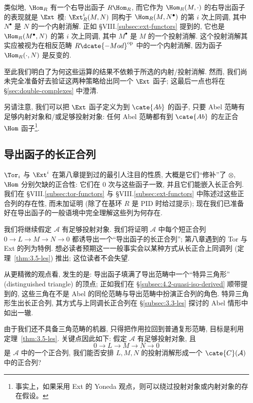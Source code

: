 \begin{example}\label{ex:7.7-ext}
类似地, $\Hom_R$ 有一个右导出函子 $R\Hom_R$, 而它作为 $\Hom_R(M,\cdot)$ 的右导出函子的表现就是 $\Ext$ 模: $\Ext_R^i(M,N)$ 同构于 $\Hom_R(M,N^\bullet)$ 的第 $i$ 次上同调, 其中 $N^\bullet$ 是 $N$ 的一个内射消解. 正如 §VIII.\ref{subsec:ext-functors} 提到的, 它也是 $\Hom_R(M^\bullet,N)$ 的第 $i$ 次上同调, 其中 $M^\bullet$ 是 $M$ 的一个投射消解. 这个投射消解其实应被视为在相反范畴 $R\dcate{-Mod}^{\mathrm{op}}$ 中的一个内射消解, 因为函子 $\Hom_R(\cdot,N)$ 是反变的.

至此我们明白了为何这些运算的结果不依赖于所选的内射/投射消解. 然而, 我们尚未完全准备好去验证这两种策略给出同一个 $\Ext$ 函子; 这最后一点也将在 \S\ref{sec:double-complexes} 中澄清.

另请注意, 我们可以把 $\Ext$ 函子定义为到 $\cate{Ab}$ 的函子, 只要 Abel 范畴有足够内射对象和/或足够投射对象: 任何 Abel 范畴都有到 $\cate{Ab}$ 的左正合 $\Hom$ 函子\footnote{事实上，如果采用 Ext 的 Yoneda 观点，则可以绕过投射对象或内射对象的存在假设。}.
\end{example}

\subsection{导出函子的长正合列}
\label{subsec:7.4-les}

$\Tor_i$ 与 $\Ext^i$ 在第八章提到过的最引人注目的性质, 大概是它们``修补''了 $\otimes$, $\Hom$ 分别欠缺的正合性: 它们在 $0$ 次与这些函子一致, 并且它们能嵌入长正合列. 我们在 §VIII.\ref{subsec:tor-functors} 与 §VIII.\ref{subsec:ext-functors} 中陈述过这些正合列的存在性, 而未加证明 (除了在基环 $R$ 是 PID 时给过提示); 现在我们已准备好在导出函子的一般语境中完全理解这些列为何存在.

我们将继续假定 $\mathcal{A}$ 有足够投射对象. 我们将证明 $\mathcal{A}$ 中每个短正合列 $0\to L\to M\to N\to 0$ 都诱导出一个``导出函子的长正合列''; 第八章遇到的 Tor 与 Ext 的列为特例. 想必读者预期这一一般事实会以某种方式从长正合上同调列 (定理~\ref{thm:3.5-les}) 推出; 这位读者不会失望.

从更精微的观点看, 发生的是: 导出函子填满了导出范畴中一个``特异三角形'' (distinguished triangle) 的顶点; 正如我们在 \S\ref{subsec:4.2-quasi-iso-derived} 顺带提到的, 这些三角在不是 Abel 的同伦范畴与导出范畴中扮演正合列的角色. 特异三角形生出长正合列, 其方式与上同调长正合列在 \S\ref{subsec:3.3-les} 探讨的 Abel 情形中如出一辙.

由于我们还不具备三角范畴的机器, 只得把作用拉回到普通复形范畴, 目标是利用定理~\ref{thm:3.5-les}. 关键点因此如下: 假定 $\mathcal{A}$ 有足够投射对象, 且
\[
0\to L\to M\to N\to 0
\]
是 $\mathcal{A}$ 中的一个正合列, 我们能否安排 $L,M,N$ 的投射消解形成一个 $\cate{C}(\mathcal{A})$ 中的正合列?

